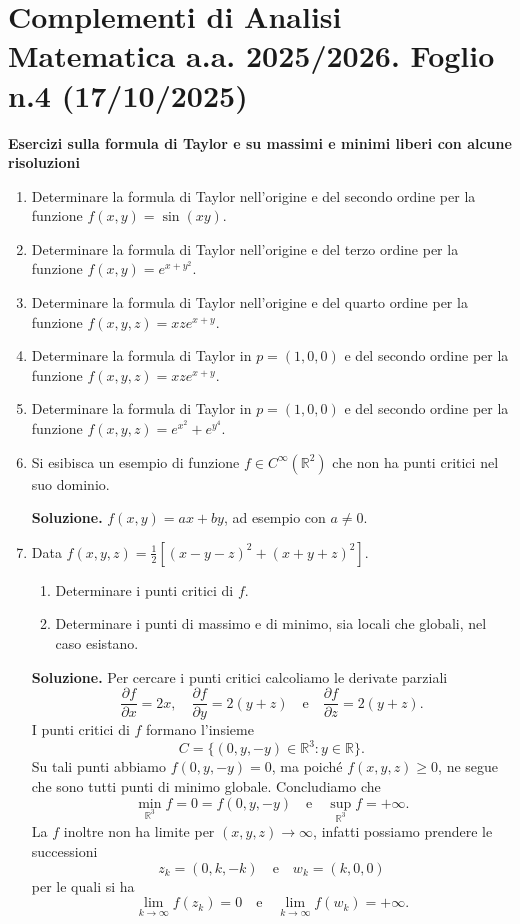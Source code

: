 \section*{Complementi di Analisi Matematica a.a. 2025/2026. Foglio n.4 (17/10/2025)}

\textbf{Esercizi sulla formula di Taylor e su massimi e minimi liberi con alcune risoluzioni}

\begin{enumerate}
	\item Determinare la formula di Taylor nell'origine e del secondo ordine per la funzione $f(x,y) = \sin(xy)$.
	
	\item Determinare la formula di Taylor nell'origine e del terzo ordine per la funzione $f(x,y) = e^{x+y^2}$.
	
	\item Determinare la formula di Taylor nell'origine e del quarto ordine per la funzione $f(x,y,z) = x z e^{x+y}$.
	
	\item Determinare la formula di Taylor in $p = (1,0,0)$ e del secondo ordine per la funzione $f(x,y,z) = x z e^{x+y}$.
	
	\item Determinare la formula di Taylor in $p = (1,0,0)$ e del secondo ordine per la funzione $f(x,y,z) = e^{x^2} + e^{y^4}$.
	
	\item Si esibisca un esempio di funzione $f \in C^\infty(\mathbb{R}^2)$ che non ha punti critici nel suo dominio.
	
	\textbf{Soluzione.}
	$f(x,y) = a x + b y$, ad esempio con $a \neq 0$.
	
	\item Data $f(x,y,z) = \frac{1}{2}\left[(x-y-z)^2 + (x+y+z)^2\right]$.
	\begin{enumerate}
		\item Determinare i punti critici di $f$.
		\item Determinare i punti di massimo e di minimo, sia locali che globali, nel caso esistano.
	\end{enumerate}
	
	\textbf{Soluzione.}
	Per cercare i punti critici calcoliamo le derivate parziali
	\[
	\frac{\partial f}{\partial x} = 2x, \quad \frac{\partial f}{\partial y} = 2(y + z) \quad \text{e} \quad \frac{\partial f}{\partial z} = 2(y + z).
	\]
	I punti critici di $f$ formano l'insieme
	\[
	C = \{(0,y,-y) \in \mathbb{R}^3 : y \in \mathbb{R}\}.
	\]
	Su tali punti abbiamo $f(0,y,-y) = 0$, ma poiché $f(x,y,z) \geq 0$, ne segue che sono tutti punti di minimo globale. Concludiamo che
	\[
	\min_{\mathbb{R}^3} f = 0 = f(0,y,-y) \quad \text{e} \quad \sup_{\mathbb{R}^3} f = +\infty.
	\]
	La $f$ inoltre non ha limite per $(x,y,z) \to \infty$, infatti possiamo prendere le successioni
	\[
	z_k = (0,k,-k) \quad \text{e} \quad w_k = (k,0,0)
	\]
	per le quali si ha
	\[
	\lim_{k \to \infty} f(z_k) = 0 \quad \text{e} \quad \lim_{k \to \infty} f(w_k) = +\infty.
	\]
	

\end{enumerate}
